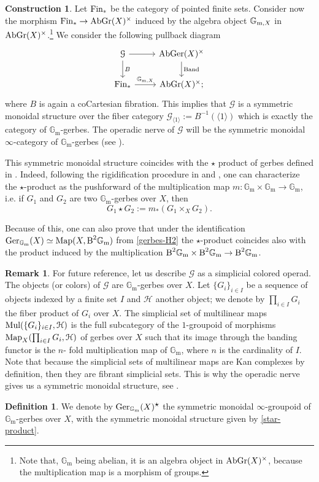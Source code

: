 \documentclass[11pt, twoside]{article} %
\numberwithin{equation}{section}
\theoremstyle{plain}
\theoremstyle{definition}
\newtheorem{defin}[thm]{Definition}
\newtheorem{rem}[thm]{Remark}
\newtheorem{construction}[thm]{Construction}
\newcommand{\B}{\textup{B}}
\newcommand{\Map}{\textup{Map}}
\newcommand{\Gm}{\mathbb G_{\mathrm{m}}}
\newcommand{\cG}{\mathcal G}
\newcommand{\cH}{\mathcal H}
\newcommand{\Ger}{\textup{Ger}}
\newcommand{\AbGer}{\textup{AbGer}}
\newcommand{\Band}{\textup{Band}}
\newcommand{\AbGr}{\textup{AbGr}}
\newcommand{\Fin}{\textup{Fin}}
\begin{document}
\begin{construction}
    
    Let $\Fin_*$ be the category of pointed finite sets. Consider now the morphism $\Fin_* \rightarrow \AbGr(X)^{\times}$ induced by the algebra object $\mathbb{G}_{\textup{m},X}$ in $\AbGr(X)^{\times}$.\footnote{Note that, $\Gm$ being abelian, it is an algebra object in $\AbGr(X)^\times$, because the multiplication map is a morphism of groups.} We consider the following pullback diagram
    $$\begin{tikzcd}
    \mathcal{G} \arrow[d, "B"] \arrow[r] & \AbGer(X)^{\times} \arrow[d, "\Band"] \\
    \Fin_* \arrow[r, "\mathbb G_{\textup{m},X}"]       & \AbGr(X)^{\times} ;                  
    \end{tikzcd}$$
    where $B$ is again a coCartesian fibration. This implies that $\mathcal{G}$ is a symmetric monoidal structure over the fiber category $\mathcal{G}_{\langle 1\rangle}:=B^{-1}(\langle 1\rangle)$ which is exactly the category of $\Gm$-gerbes. The operadic nerve of $\mathcal{G}$ will be the symmetric monoidal $\infty$-category of $\Gm$-gerbes (see \cite[Proposition 2.1.1.27]{HA}).
    
    This symmetric monoidal structure coincides with the $\star$ product of gerbes defined in \cite[Construction 3.8]{Bergh-Schnurer}. Indeed, following the rigidification procedure in \cite[Exercise 12.F]{Olsson} and \cite[Appendix A]{AOV}, one can characterize the $\star$-product as the pushforward of the multiplication map $m:\Gm\times \Gm\to \Gm$, i.e. if $G_1$ and $G_2$ are two $\Gm$-gerbes over $X$, then $$G_1 \star G_2:= m_*(G_1 \times_X G_2).$$

    Because of this, one can also prove that under the identification $\Ger_{\Gm}(X)\simeq \Map(X,\B^2\Gm)$ from \cref{gerbes-H2} the $\star$-product coincides also with the product induced by the multiplication $\B^2\Gm\times \B^2\Gm\to \B^2\Gm$.
    \end{construction}
    \begin{rem}
	     For future reference, let us describe $\cG$ as a simplicial colored operad. The objects (or colors) of $\cG$ are $\Gm$-gerbes over $X$. Let $\{ G_i\}_{i \in I}$ be a sequence of objects indexed by a finite set $I$ and $\cH$ another object; we denote by $\prod_{i\in I}G_i$ the fiber product of $G_i$ over $X$. The simplicial set of multilinear maps $\textup{Mul}(\{ G_i\}_{i \in I}, \cH)$ is the full subcategory of the $1$-groupoid of morphisms  $\textup{Map}_X(\prod_{i \in I} G_i, \cH)$ of gerbes over $X$ such that its image through the banding functor is the $n$- fold multiplication map of $\Gm$, where $n$ is the cardinality of $I$. Note that because the simplicial sets of multilinear maps are Kan complexes by definition, then they are fibrant simplicial sets. This is why the operadic nerve gives us a symmetric monoidal structure, see \cite[Proposition 2.1.1.27]{HA}.
	\end{rem}
    \begin{defin}
		We denote by $\Ger_{\Gm}(X)^{\mathlarger\star}$ the symmetric monoidal $\infty$-groupoid of $\Gm$-gerbes over $X$, with the symmetric monoidal structure given by \cref{star-product}.
	\end{defin}
\end{document}
